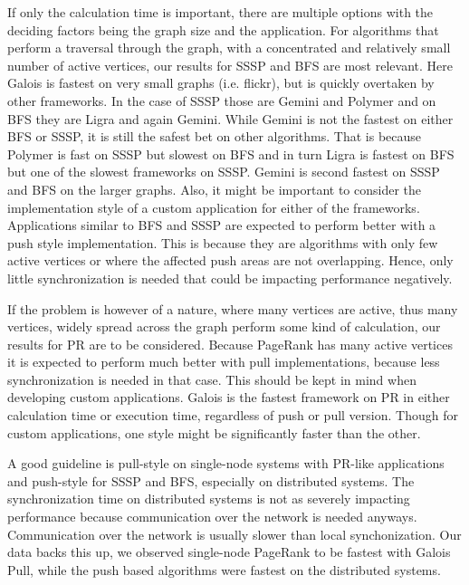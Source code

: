 If only the calculation time is important, there are multiple options with the deciding factors being the graph size and the application.
For algorithms that perform a traversal through the graph, with a concentrated and relatively small number of active vertices, our results for SSSP and BFS are most relevant.
Here Galois is fastest on very small graphs (i.e. flickr), but is quickly overtaken by other frameworks.
In the case of SSSP those are Gemini and Polymer and on BFS they are Ligra and again Gemini. While Gemini is not the fastest on either BFS or SSSP, it is still the safest bet on other algorithms. That is because Polymer is fast on SSSP but slowest on BFS and in turn Ligra is fastest on BFS but one of the slowest frameworks on SSSP. Gemini is second fastest on SSSP and BFS on the larger graphs.
Also, it might be important to consider the implementation style of a custom application for either of the frameworks.
Applications similar to BFS and SSSP are expected to perform better with a push style implementation. 
This is because they are algorithms with only few active vertices or where the affected push areas are not overlapping. 
Hence, only little synchronization is needed that could be impacting performance negatively.

If the problem is however of a nature, where many vertices are active, thus many vertices, widely spread across the graph perform some kind of calculation, our results for PR are to be considered.
Because PageRank has many active vertices it is expected to perform much better with pull implementations, because less synchronization is needed in that case. This should be kept in mind when developing custom applications.
Galois is the fastest framework on PR in either calculation time or execution time, regardless of push or pull version. Though for custom applications, one style might be significantly faster than the other.

A good guideline is pull-style on single-node systems with PR-like applications and push-style for SSSP and BFS, especially on distributed systems.
The synchronization time on distributed systems is not as severely impacting performance because communication over the network is needed anyways. Communication over the network is usually slower than local synchonization.
Our data backs this up, we observed single-node PageRank to be fastest with Galois Pull, while the push based algorithms were fastest on the distributed systems.

